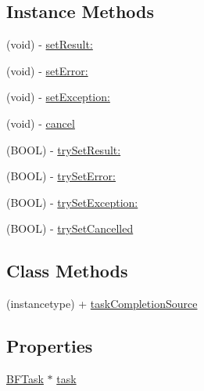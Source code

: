 \subsection*{Instance Methods}
\begin{DoxyCompactItemize}
\item 
(void) -\/ \hyperlink{interface_b_f_task_completion_source_abed0b58e2611f5775d1a373c02dd5f39}{set\-Result\-:}
\item 
(void) -\/ \hyperlink{interface_b_f_task_completion_source_a01b81813ac47e1f729bb2418102a987e}{set\-Error\-:}
\item 
(void) -\/ \hyperlink{interface_b_f_task_completion_source_a40755dcab284b5404bcb896a9e0f3ec7}{set\-Exception\-:}
\item 
(void) -\/ \hyperlink{interface_b_f_task_completion_source_a945538d5ef1ea6110ced6a7417955ec5}{cancel}
\item 
(B\-O\-O\-L) -\/ \hyperlink{interface_b_f_task_completion_source_ab083534e8cadd435953acc8572daf2f7}{try\-Set\-Result\-:}
\item 
(B\-O\-O\-L) -\/ \hyperlink{interface_b_f_task_completion_source_a65065b1c8dad949e4aea15c8c37b479e}{try\-Set\-Error\-:}
\item 
(B\-O\-O\-L) -\/ \hyperlink{interface_b_f_task_completion_source_acc07a13997407c9cdb6557917af5c85f}{try\-Set\-Exception\-:}
\item 
(B\-O\-O\-L) -\/ \hyperlink{interface_b_f_task_completion_source_ac243420ce687eba4233e38726459bb61}{try\-Set\-Cancelled}
\end{DoxyCompactItemize}
\subsection*{Class Methods}
\begin{DoxyCompactItemize}
\item 
(instancetype) + \hyperlink{interface_b_f_task_completion_source_a03e74e794abea79ea56c8465b25d519d}{task\-Completion\-Source}
\end{DoxyCompactItemize}
\subsection*{Properties}
\begin{DoxyCompactItemize}
\item 
\hyperlink{interface_b_f_task}{B\-F\-Task} $\ast$ \hyperlink{interface_b_f_task_completion_source_ad1f81ce26de7298f4a195a62b595a989}{task}
\end{DoxyCompactItemize}


